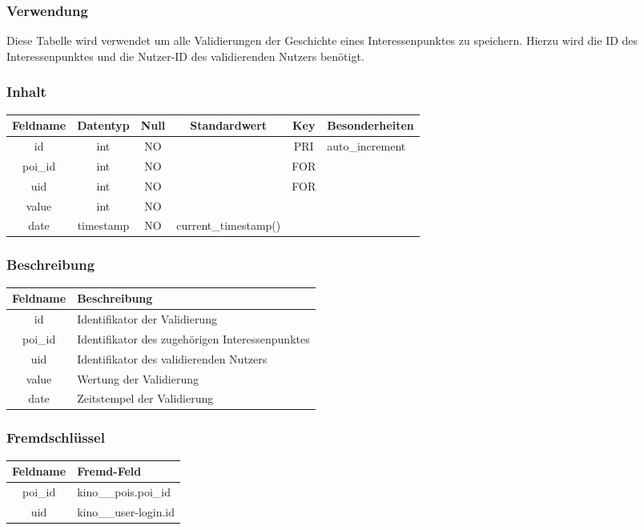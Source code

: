 \subsubsection{Verwendung} Diese Tabelle wird verwendet um alle Validierungen der Geschichte eines Interessenpunktes zu speichern. Hierzu wird die ID des Interessenpunktes und die Nutzer-ID des validierenden Nutzers benötigt.
\subsubsection{Inhalt}
\begin{table}[H]
	\begin{tabular}{|c|c|c|c|c|p{3.5cm}|}
		\hline
		\textbf{Feldname} & \textbf{Datentyp} & \textbf{Null} & \textbf{Standardwert} & \textbf{Key}   & \textbf{Besonderheiten} \\ \hline
		id & int & NO &  & PRI & auto\_increment \\ \hline
		poi\_id & int & NO &  & FOR & \\ \hline
		uid & int & NO &  & FOR & \\ \hline
		value & int & NO &  &  & \\ \hline
		date & timestamp & NO & current\_timestamp() &  & \\ \hline
	\end{tabular}
\end{table}
\subsubsection{Beschreibung}
\begin{table}[H]
	\begin{tabular}{|c|p{12cm}|}
		\hline
		\textbf{Feldname} & \textbf{Beschreibung} \\ \hline
		id & Identifikator der Validierung \\ \hline
		poi\_id & Identifikator des zugehörigen Interessenpunktes \\ \hline
		uid & Identifikator des validierenden Nutzers \\ \hline
		value & Wertung der Validierung \\ \hline
		date & Zeitstempel der Validierung \\ \hline
	\end{tabular}
\end{table}
\subsubsection{Fremdschlüssel}
\begin{table}[H]
	\begin{tabular}{|c|p{12.5cm}|}
		\hline
		\textbf{Feldname} & \textbf{Fremd-Feld} \\ \hline
		poi\_id & kino\_\_pois.poi\_id \\ \hline
		uid & kino\_\_user-login.id \\ \hline
	\end{tabular}
\end{table}
